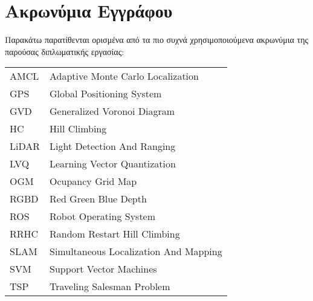 \chapter*{Ακρωνύμια Εγγράφου}
\label{append:acronyms}
{}

Παρακάτω παρατίθενται ορισμένα από τα πιο συχνά χρησιμοποιούμενα ακρωνύμια της
παρούσας διπλωματικής εργασίας:

\begin{table}[htpb]
  \centering
  \begin{tabular}{l@{$\;\;\longrightarrow\;\;$}l}
    AMCL & Adaptive Monte Carlo Localization \\
    GPS & Global Positioning System \\
    GVD & Generalized Voronoi Diagram \\
    HC & Hill Climbing \\
    LiDAR & Light Detection And Ranging \\
    LVQ & Learning Vector Quantization \\
    OGM & Ocupancy Grid Map \\
    RGBD & Red Green Blue Depth \\
    ROS & Robot Operating System \\
    RRHC & Random Restart Hill Climbing \\
    SLAM & Simultaneous Localization And Mapping \\
    SVM & Support Vector Machines \\
    TSP & Traveling Salesman Problem \\
  \end{tabular}
\end{table}
